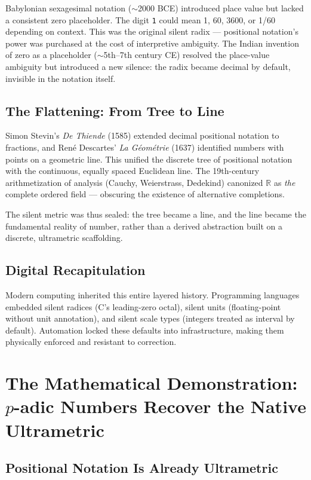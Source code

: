 \documentclass[12pt,a4paper]{article}
\theoremstyle{definition}
\theoremstyle{remark}
\newcommand{\R}{\mathbb{R}}
\begin{document}
Babylonian sexagesimal notation ($\sim$2000 BCE) introduced place value but lacked
a consistent zero placeholder. The digit \texttt{1} could mean 1, 60, 3600, or 1/60
depending on context. This was the original silent radix --- positional notation's
power was purchased at the cost of interpretive ambiguity. The Indian invention of
zero as a placeholder ($\sim$5th--7th century CE) resolved the place-value
ambiguity but introduced a new silence: the radix became decimal by default,
invisible in the notation itself.

\subsection{The Flattening: From Tree to Line}

Simon Stevin's \emph{De Thiende} (1585) extended decimal positional notation to
fractions, and Ren\'{e} Descartes' \emph{La G\'{e}om\'{e}trie} (1637) identified
numbers with points on a geometric line. This unified the discrete tree of
positional notation with the continuous, equally spaced Euclidean line. The
19th-century arithmetization of analysis (Cauchy, Weierstrass, Dedekind) canonized
$\R$ as \emph{the} complete ordered field --- obscuring the existence of
alternative completions.

The silent metric was thus sealed: the tree became a line, and the line became the
fundamental reality of number, rather than a derived abstraction built on a
discrete, ultrametric scaffolding.

\subsection{Digital Recapitulation}

Modern computing inherited this entire layered history. Programming languages
embedded silent radices (C's leading-zero octal), silent units (floating-point
without unit annotation), and silent scale types (integers treated as interval by
default). Automation locked these defaults into infrastructure, making them
physically enforced and resistant to correction.

\section{The Mathematical Demonstration: $p$-adic Numbers Recover the Native Ultrametric}

\subsection{Positional Notation Is Already Ultrametric}
\end{document}
